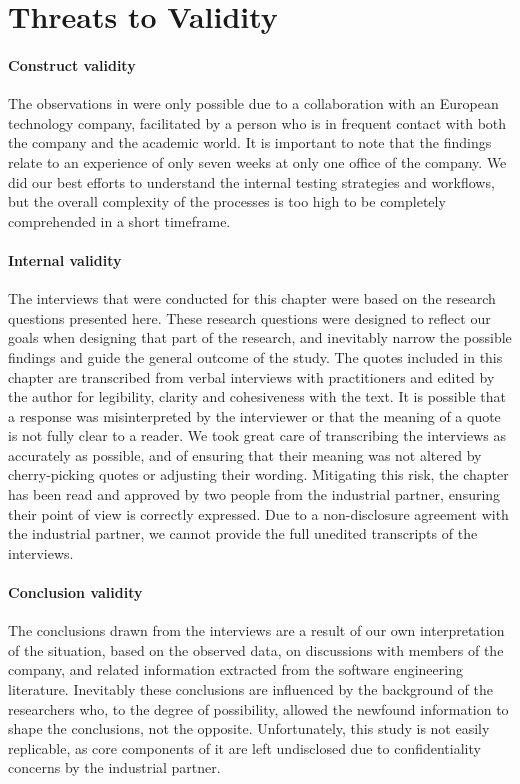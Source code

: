 \section{Threats to Validity}
\label{sec:ind_threats}

\paragraph{Construct validity}
The observations in  were only possible due to a collaboration with an European technology company, facilitated by a person who is in frequent contact with both the company and the academic world.
It is important to note that the findings relate to an experience of only seven weeks at only one office of the company.
We did our best efforts to understand the internal testing strategies and workflows, but the overall complexity of the processes is too high to be completely comprehended in a short timeframe.

\paragraph{Internal validity} 
The interviews that were conducted for this chapter were based on the research questions presented here.
These research questions were designed to reflect our goals when designing that part of the research, and inevitably narrow the possible findings and guide the general outcome of the study.
The quotes included in this chapter are transcribed from verbal interviews with practitioners and edited by the author for legibility, clarity and cohesiveness with the text.
It is possible that a response was misinterpreted by the interviewer or that the meaning of a quote is not fully clear to a reader.
We took great care of transcribing the interviews as accurately as possible, and of ensuring that their meaning was not altered by cherry-picking quotes or adjusting their wording.
Mitigating this risk, the chapter has been read and approved by two people from the industrial partner, ensuring their point of view is correctly expressed.
Due to a non-disclosure agreement with the industrial partner, we cannot provide the full unedited transcripts of the interviews.

\paragraph{Conclusion validity}
The conclusions drawn from the interviews are a result of our own interpretation of the situation, based on the observed data, on discussions with members of the company, and related information extracted from the software engineering literature.
Inevitably these conclusions are influenced by the background of the researchers who, to the degree of possibility, allowed the newfound information to shape the conclusions, not the opposite.
Unfortunately, this study is not easily replicable, as core components of it are left undisclosed due to confidentiality concerns by the industrial partner. 

